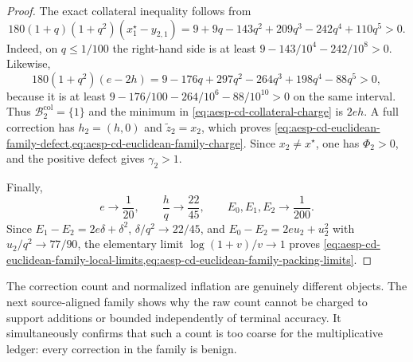 \begin{proof}
The exact collateral inequality follows from
\begin{equation*}
 180(1+q)(1+q^2)(x_1^\star-y_{2,1})
 =9+9q-143q^2+209q^3-242q^4+110q^5>0.
\end{equation*}
Indeed, on $q\leq1/100$ the right-hand side is at least
$9-143/10^4-242/10^8>0$.  Likewise,
\begin{equation*}
 180(1+q^2)(e-2h)
 =9-176q+297q^2-264q^3+198q^4-88q^5>0,
\end{equation*}
because it is at least
$9-176/100-264/10^6-88/10^{10}>0$ on the same interval.
Thus $\mathcal B_2^{\mathrm{col}}=\{1\}$ and the minimum in
\cref{eq:aesp-cd-collateral-charge} is $2eh$.  A full correction has
$h_2=(h,0)$ and $\widetilde z_2=x_2$, which proves
\cref{eq:aesp-cd-euclidean-family-defect,eq:aesp-cd-euclidean-family-charge}.
Since $x_2\neq x^\star$, one has $\Phi_2>0$, and the positive defect gives
$\gamma_2>1$.

Finally,
\begin{equation*}
 e\longrightarrow\frac1{20},
 \qquad
 \frac hq\longrightarrow\frac{22}{45},
 \qquad
 E_0,E_1,E_2\longrightarrow\frac1{200}.
\end{equation*}
Since $E_1-E_2=2e\delta+\delta^2$,
$\delta/q^2\to22/45$, and
$E_0-E_2=2eu_2+u_2^2$ with $u_2/q^2\to77/90$, the elementary limit
$\log(1+v)/v\to1$ proves
\cref{eq:aesp-cd-euclidean-family-local-limits,eq:aesp-cd-euclidean-family-packing-limits}.
\end{proof}

The correction count and normalized inflation are genuinely different
objects.  The next source-aligned family shows why the raw count cannot be
charged to support additions or bounded independently of terminal accuracy.
It simultaneously confirms that such a count is too coarse for the
multiplicative ledger: every correction in the family is benign.
